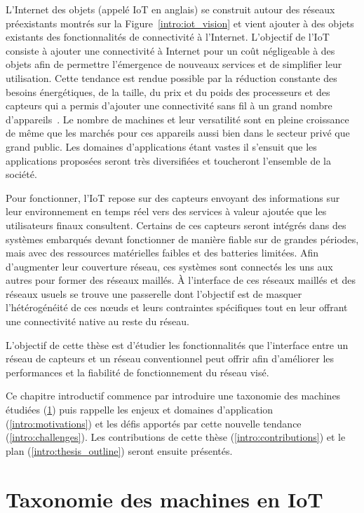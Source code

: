 L'Internet des objets (appelé \ac{IoT} en anglais) se construit autour des réseaux préexistants montrés sur la Figure~\ref{intro:iot_vision} et vient ajouter à des objets existants des fonctionnalités de connectivité à l'Internet.
L'objectif de l'\ac{IoT} consiste à ajouter une connectivité à Internet pour un coût négligeable à des objets afin de permettre l'émergence de nouveaux services et de simplifier leur utilisation.
Cette tendance est rendue possible par la réduction constante des besoins énergétiques, de la taille, du prix et du poids des processeurs et des capteurs qui a permis d'ajouter une connectivité sans fil à un grand nombre d'appareils~\cite{koomey2011implications}.
Le nombre de machines et leur versatilité sont en pleine croissance~\cite{gubbi2013internet} de même que les marchés pour ces appareils aussi bien dans le secteur privé que grand public.
Les domaines d'applications étant vastes il s'ensuit que les applications proposées seront très diversifiées et toucheront l'ensemble de la société.

Pour fonctionner, l'\ac{IoT} repose sur des capteurs envoyant des informations sur leur environnement en temps réel vers des services à valeur ajoutée que les utilisateurs finaux consultent.
Certains de ces capteurs seront intégrés dans des systèmes embarqués devant fonctionner de manière fiable sur de grandes périodes, mais avec des ressources matérielles faibles et des batteries limitées.
Afin d'augmenter leur couverture réseau, ces systèmes sont connectés les uns aux autres pour former des réseaux maillés.
À l'interface de ces réseaux maillés et des réseaux usuels se trouve une passerelle dont l'objectif est de masquer l’hétérogénéité de ces nœuds et leurs contraintes spécifiques tout en leur offrant une connectivité native au reste du réseau.

L'objectif de cette thèse est d'étudier les fonctionnalités que l'interface entre un réseau de capteurs et un réseau conventionnel peut offrir afin d'améliorer les performances et la fiabilité de fonctionnement du réseau visé.

Ce chapitre introductif commence par introduire une taxonomie des machines étudiées (\ref{intro:taxonomy}) puis rappelle les enjeux et domaines d'application (\ref{intro:motivations}) et les défis apportés par cette nouvelle tendance (\ref{intro:challenges}).
Les contributions de cette thèse (\ref{intro:contributions}) et le plan (\ref{intro:thesis_outline}) seront ensuite présentés.

\section{Taxonomie des machines en \ac{IoT}}
\label{intro:taxonomy}

